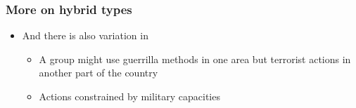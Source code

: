\documentclass[aspectratio=43]{beamer}
\begin{document}


\begin{frame}
\frametitle{More on hybrid types}
\centering

\begin{itemize}
  \item And there is also variation in {\color{red}{space}}
  \begin{itemize}
    \item<2-> A group might use guerrilla methods in one area but terrorist actions in another part of the country
    \item<3-> Actions constrained by military capacities
  \end{itemize}
\end{itemize}



\end{frame}
\end{document}
